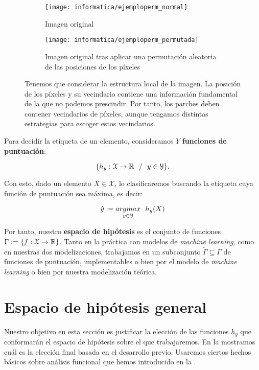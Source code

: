 \begin{figure}[!hbtp]
	\centering
	\ajustarsubcaptions
	\begin{subfigure}[t]{0.45\textwidth}
		\centering
		\texttt{[image: informatica/ejemploperm\_normal]}
		\caption{Imagen original}
	\end{subfigure}
	\begin{subfigure}[t]{0.45\textwidth}
		\centering
		\texttt{[image: informatica/ejemploperm\_permutada]}
		\caption{Imagen original tras aplicar una permutación aleatoria de las posiciones de los píxeles}
	\end{subfigure}
	\caption{Tenemos que considerar la estructura local de la imagen. La posición de los píxeles y su vecindario contiene una información fundamental de la que no podemos prescindir. Por tanto, los parches deben contener vecindarios de píxeles, aunque tengamos distintas estrategias para escoger estos vecindarios.}
	\label{img:desordenar_pixeles_repetida_mates}
\end{figure}

Para decidir la etiqueta de un elemento, consideramos $Y$ \textbf{funciones de puntuación}:

\begin{equation}
	\{ h_y: \mathcal{X} \to \mathbb{R} \ \  / \ \  y \in \mathcal{Y} \}.
\end{equation}

Con esto, dado un elemento $X \in \mathcal{X}$, lo clasificaremos buscando la etiqueta cuya función de puntuación sea máxima, es decir:

$$\hat{y} := \underset{y \in \mathcal{Y}}{argmax} \ \  h_y(X)$$

Por tanto, nuestro \textbf{espacio de hipótesis} es el conjunto de funciones $\Gamma := \{ f: \mathcal{X} \to \mathbb{R} \}$. Tanto en la práctica con modelos de \textit{machine learning}, como en nuestras dos modelizaciones, trabajamos en un subconjunto $\tilde{\Gamma} \subseteq \Gamma$ de funciones de puntuación, implementables o bien por el modelo de \textit{machine learning} o bien por nuestra modelización teórica.

\section{Espacio de hipótesis general}

Nuestro objetivo en esta sección es justificar la elección de las funciones $h_y$ que conformarán el espacio de hipótesis sobre el que trabajaremos. En la  mostramos cuál es la elección final basada en el desarrollo previo. Usaremos ciertos hechos básicos sobre análisis funcional que hemos introducido en la .

